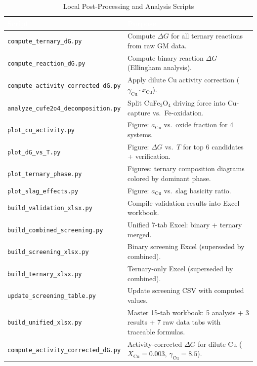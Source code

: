 \documentclass[11pt]{article}
\begin{document}
\begin{table}[H]
\caption{Local Post-Processing and Analysis Scripts}
\label{tab:local_scripts}
\centering
\renewcommand{\arraystretch}{1.15}
\footnotesize
\begin{tabular}{|p{2.8in}|p{3.2in}|}
\hline
\rowcolor{headercolor}
\textcolor{white}{\textbf{Script}} & \textcolor{white}{\textbf{Purpose}} \\
\hline
\texttt{compute\_ternary\_dG.py} & Compute $\Delta G$ for all ternary reactions from raw GM data. \\
\hline
\rowcolor{altrow}
\texttt{compute\_reaction\_dG.py} & Compute binary reaction $\Delta G$ (Ellingham analysis). \\
\hline
\texttt{compute\_activity\_corrected\_dG.py} & Apply dilute Cu activity correction ($\gamma_{\text{Cu}} \cdot x_{\text{Cu}}$). \\
\hline
\rowcolor{altrow}
\texttt{analyze\_cufe2o4\_decomposition.py} & Split CuFe$_2$O$_4$ driving force into Cu-capture vs.\ Fe-oxidation. \\
\hline
\texttt{plot\_cu\_activity.py} & Figure: $a_{\text{Cu}}$ vs.\ oxide fraction for 4 systems. \\
\hline
\rowcolor{altrow}
\texttt{plot\_dG\_vs\_T.py} & Figure: $\Delta G$ vs.\ $T$ for top 6 candidates + verification. \\
\hline
\texttt{plot\_ternary\_phase.py} & Figures: ternary composition diagrams colored by dominant phase. \\
\hline
\rowcolor{altrow}
\texttt{plot\_slag\_effects.py} & Figure: $a_{\text{Cu}}$ vs.\ slag basicity ratio. \\
\hline
\texttt{build\_validation\_xlsx.py} & Compile validation results into Excel workbook. \\
\hline
\rowcolor{altrow}
\texttt{build\_combined\_screening.py} & Unified 7-tab Excel: binary + ternary merged. \\
\hline
\texttt{build\_screening\_xlsx.py} & Binary screening Excel (superseded by combined). \\
\hline
\rowcolor{altrow}
\texttt{build\_ternary\_xlsx.py} & Ternary-only Excel (superseded by combined). \\
\hline
\texttt{update\_screening\_table.py} & Update screening CSV with computed values. \\
\hline
\rowcolor{altrow}
\texttt{build\_unified\_xlsx.py} & Master 15-tab workbook: 5 analysis + 3 results + 7 raw data tabs with traceable formulas. \\
\hline
\texttt{compute\_activity\_corrected\_dG.py} & Activity-corrected $\Delta G$ for dilute Cu ($X_{\text{Cu}}=0.003$, $\gamma_{\text{Cu}}=8.5$). \\
\hline
\end{tabular}
\end{table}
\end{document}
